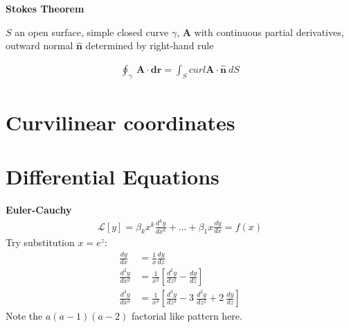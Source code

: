 \documentclass{article}
\begin{document}
\noindent
\textbf{Stokes Theorem}
\begin{flushleft}
    $S$ an open surface, simple closed curve $\gamma$, $\mathbf{A}$ with continuous partial derivatives, 
    outward normal $\mathbf{\hat{n}}$ determined by right-hand rule
\end{flushleft} 
\begin{align*}
    \oint_{\gamma} \  \mathbf{A} \cdot \mathbf{dr} = \int_{S} curl \mathbf{A} \cdot \mathbf{\hat{n}} \ dS
\end{align*}  

\section{Curvilinear coordinates}

\section{Differential Equations}

\textbf{Euler-Cauchy}
\begin{align*}
    \mathcal{L}[y] = \beta_{k}x^k \frac{d^ky}{dx^k} + \dots + \beta_{1} x \frac{dy}{dx} = f(x) 
\end{align*}
Try substitution $x=e^z$:
\begin{align*}
    \frac{dy}{dx} &= \frac{1}{x} \frac{dy}{dz} \\
    \frac{d^2y}{dx^2} &= \frac{1}{x^2} [\frac{d^2y}{dz^2}-\frac{dy}{dz}] \\
    \frac{d^3y}{dx^3} &= \frac{1}{x^3} [\frac{d^3y}{dz^3}-3 \ \frac{d^2y}{dz^2}+2 \ \frac{dy}{dz}]
\end{align*}
Note the $a(a-1)(a-2)$ factorial like pattern here.
\end{document}
